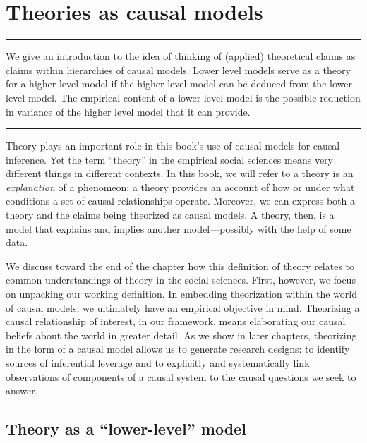 \documentclass[
  12pt,
]{book}
\begin{document}
\hypertarget{theory}{%
\chapter{Theories as causal models}\label{theory}}

\begin{center}\rule{0.5\linewidth}{0.5pt}\end{center}

We give an introduction to the idea of thinking of (applied) theoretical claims as claims within hierarchies of causal models. Lower level models serve as a theory for a higher level model if the higher level model can be deduced from the lower level model. The empirical content of a lower level model is the possible reduction in variance of the higher level model that it can provide.

\begin{center}\rule{0.5\linewidth}{0.5pt}\end{center}

Theory plays an important role in this book's use of causal models for causal inference. Yet the term ``theory'' in the empirical social sciences means very different things in different contexts. In this book, we will refer to a theory is an \emph{explanation} of a phenomeon: a theory provides an account of how or under what conditions a set of causal relationships operate. Moreover, we can express both a theory and the claims being theorized as causal models. A theory, then, is a model that explains and implies another model---possibly with the help of some data.

We discuss toward the end of the chapter how this definition of theory relates to common understandings of theory in the social sciences. First, however, we focus on unpacking our working definition. In embedding theorization within the world of causal models, we ultimately have an empirical objective in mind. Theorizing a causal relationship of interest, in our framework, means elaborating our causal beliefs about the world in greater detail. As we show in later chapters, theorizing in the form of a causal model allows us to generate research designs: to identify sources of inferential leverage and to explicitly and systematically link observations of components of a causal system to the causal questions we seek to answer.

\hypertarget{theory-as-a-lower-level-model}{%
\section{Theory as a ``lower-level'' model}\label{theory-as-a-lower-level-model}}
\end{document}
